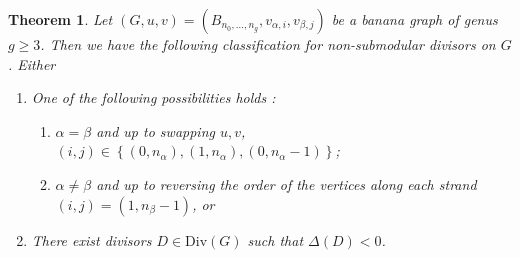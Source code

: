 \documentclass[11pt]{article}
\newtheorem{theorem}[theo]{Theorem}
\theoremstyle{definition}
\numberwithin{equation}{section}
\newcommand{\opdiv}[1]{\mathrm{Div}\left({#1}\right)}
\newcommand{\set}[1]{\left\{{#1}\right\}}
\begin{document}
\begin{theorem}\label{thm-NSMForBanana}
Let $(G,u,v) = (B_{n_0,\dots,n_g},v_{\alpha,i},v_{\beta,j})$ be a banana graph of genus $g \geq 3$. Then we have the following classification for non-submodular divisors on $G$. Either
\begin{enumerate}[label = \arabic*)]
    \item One of the following possibilities holds :
    \begin{enumerate}[label = \alph*)]
        \item $\alpha = \beta$ and up to swapping $u,v$, $(i,j) \in \set{(0,n_\alpha),(1,n_\alpha),(0,n_\alpha-1)}$;
        \item $\alpha \neq \beta$ and up to reversing the order of the vertices along each strand $(i,j) = (1,n_\beta-1)$, or
    \end{enumerate}
    \item There exist divisors $D \in \opdiv{G}$ such that $\Delta(D)<0$.
\end{enumerate}
\end{theorem}
\end{document}
